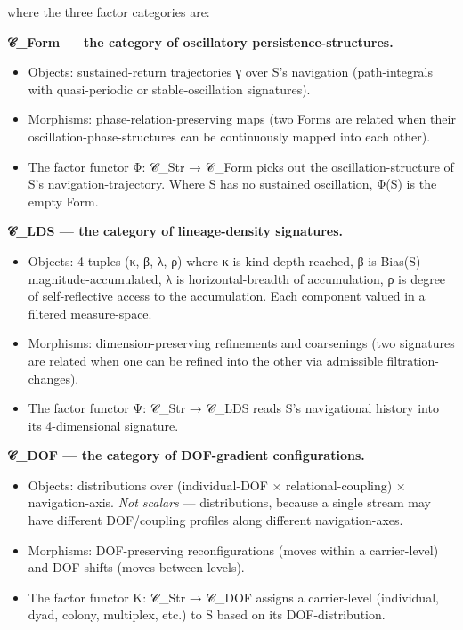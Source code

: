\documentclass[11pt, openany]{book}
\begin{document}
where the three factor categories are:

\textbf{𝒞\_\allowbreak{}Form --- the category of oscillatory persistence-structures.}
\begin{itemize}
\item Objects: sustained-return trajectories γ over S's navigation (path-integrals with quasi-periodic or stable-oscillation signatures).
\item Morphisms: phase-relation-preserving maps (two Forms are related when their oscillation-phase-structures can be continuously mapped into each other).
\item The factor functor Φ: 𝒞\_\allowbreak{}Str → 𝒞\_\allowbreak{}Form picks out the oscillation-structure of S's navigation-trajectory. Where S has no sustained oscillation, Φ(S) is the empty Form.
\end{itemize}

\textbf{𝒞\_\allowbreak{}LDS --- the category of lineage-density signatures.}
\begin{itemize}
\item Objects: 4-tuples (κ, β, λ, ρ) where κ is kind-depth-reached, β is Bias(S)-magnitude-accumulated, λ is horizontal-breadth of accumulation, ρ is degree of self-reflective access to the accumulation. Each component valued in a filtered measure-space.
\item Morphisms: dimension-preserving refinements and coarsenings (two signatures are related when one can be refined into the other via admissible filtration-changes).
\item The factor functor Ψ: 𝒞\_\allowbreak{}Str → 𝒞\_\allowbreak{}LDS reads S's navigational history into its 4-dimensional signature.
\end{itemize}

\textbf{𝒞\_\allowbreak{}DOF --- the category of DOF-gradient configurations.}
\begin{itemize}
\item Objects: distributions over (individual-DOF × relational-coupling) × navigation-axis. \textit{Not scalars} --- distributions, because a single stream may have different DOF/coupling profiles along different navigation-axes.
\item Morphisms: DOF-preserving reconfigurations (moves within a carrier-level) and DOF-shifts (moves between levels).
\item The factor functor Κ: 𝒞\_\allowbreak{}Str → 𝒞\_\allowbreak{}DOF assigns a carrier-level (individual, dyad, colony, multiplex, etc.) to S based on its DOF-distribution.
\end{itemize}
\end{document}
